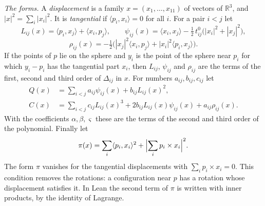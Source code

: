 \documentclass[reqno,a4paper,11pt]{amsart}
\numberwithin{equation}{section}
\def\R{{\mathbb R}}
\begin{document}
\emph{The forms.} A \emph{displacement} is a family $x = (x_1, \dots, x_{11})$ of vectors of $\R^3$, and $|x|^2 = \sum_i |x_i|^2$. It is \emph{tangential} if $\langle p_i, x_i \rangle = 0$ for all $i$. For a pair $i < j$ let
$$
L_{ij}(x) = \langle p_i, x_j \rangle + \langle x_i, p_j \rangle, \qquad
\psi_{ij}(x) = \langle x_i, x_j \rangle - \tfrac12 \, t^0_{ij} \bigl( |x_i|^2 + |x_j|^2 \bigr),
$$
$$
\rho_{ij}(x) = - \tfrac12 \bigl( |x_j|^2 \langle x_i, p_j \rangle + |x_i|^2 \langle p_i, x_j \rangle \bigr) .
$$
If the points of $p$ lie on the sphere and $y_i$ is the point of the sphere near $p_i$ for which $y_i - p_i$ has the tangential part $x_i$, then $L_{ij}$, $\psi_{ij}$ and $\rho_{ij}$ are the terms of the first, second and third order of $\Delta_{ij}$ in $x$. For numbers $a_{ij}, b_{ij}, c_{ij}$ let
\begin{align*}
Q(x) &= \sum_{i<j} a_{ij} \psi_{ij}(x) + b_{ij} L_{ij}(x)^2, \\
C(x) &= \sum_{i<j} c_{ij} L_{ij}(x)^3 + 2 b_{ij} L_{ij}(x) \psi_{ij}(x) + a_{ij} \rho_{ij}(x) .
\end{align*}
With the coefficients $\alpha, \beta, \varsigma$ these are the terms of the second and third order of the polynomial. Finally let
$$
\pi(x) = \sum_i \langle p_i, x_i \rangle^2 + \Bigl| \sum_i p_i \times x_i \Bigr|^2 .
$$
The form $\pi$ vanishes for the tangential displacements with $\sum_i p_i \times x_i = 0$. This condition removes the rotations: a configuration near $p$ has a rotation whose displacement satisfies it. In Lean the second term of $\pi$ is written with inner products, by the identity of Lagrange.
\end{document}

